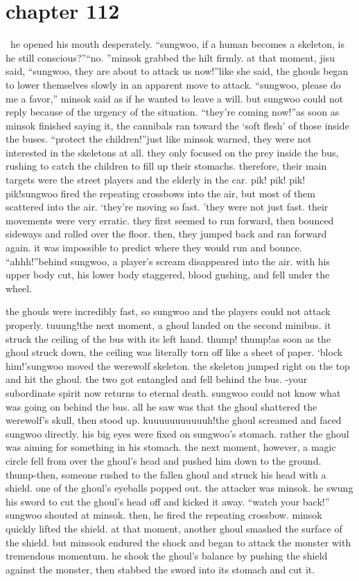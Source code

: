 \section{chapter 112}






 he opened his mouth desperately.
“sungwoo, if a human becomes a skeleton, is he still conscious?”“no.
”minsok grabbed the hilt firmly.
at that moment, jisu said, “sungwoo, they are about to attack us now!”like she said, the ghouls began to lower themselves slowly in an apparent move to attack.
“sungwoo, please do me a favor,” minsok said as if he wanted to leave a will.
but sungwoo could not reply because of the urgency of the situation.
“they’re coming now!”as soon as minsok finished saying it, the cannibals ran toward the ‘soft flesh’ of those inside the buses.
“protect the children!”just like minsok warned, they were not interested in the skeletons at all.
 they only focused on the prey inside the bus, rushing to catch the children to fill up their stomachs.
therefore, their main targets were the street players and the elderly in the car.
pik! pik! pik! pik!sungwoo fired the repeating crossbows into the air, but most of them scattered into the air.
‘they’re moving so fast.
’they were not just fast.
 their movements were very erratic.
they first seemed to run forward, then bounced sideways and rolled over the floor.
 then, they jumped back and ran forward again.
 it was impossible to predict where they would run and bounce.
“ahhh!”behind sungwoo, a player’s scream disappeared into the air.
 with his upper body cut, his lower body staggered, blood gushing, and fell under the wheel.

the ghouls were incredibly fast, so sungwoo and the players could not attack properly.
tuuung!the next moment, a ghoul landed on the second minibus.
 it struck the ceiling of the bus with its left hand.
thump! thump!as soon as the ghoul struck down, the ceiling was literally torn off like a sheet of paper.
‘block him!’sungwoo moved the werewolf skeleton.
 the skeleton jumped right on the top and hit the ghoul.
 the two got entangled and fell behind the bus.
-your subordinate spirit now returns to eternal death.
sungwoo could not know what was going on behind the bus.
 all he saw was that the ghoul shattered the werewolf’s skull, then stood up.
kuuuuuuuuuuuh!the ghoul screamed and faced sungwoo directly.
 his big eyes were fixed on sungwoo’s stomach.
 rather the ghoul was aiming for something in his stomach.
the next moment, however, a magic circle fell from over the ghoul’s head and pushed him down to the ground.
thump-then, someone rushed to the fallen ghoul and struck his head with a shield.
one of the ghoul’s eyeballs popped out.
 the attacker was minsok.
 he swung his sword to cut the ghoul’s head off and kicked it away.
“watch your back!” sungwoo shouted at minsok.
then, he fired the repeating crossbow.
minsok quickly lifted the shield.
at that moment, another ghoul smashed the surface of the shield.
but minsook endured the shock and began to attack the monster with tremendous momentum.
he shook the ghoul’s balance by pushing the shield against the monster, then stabbed the sword into its stomach and cut it.

